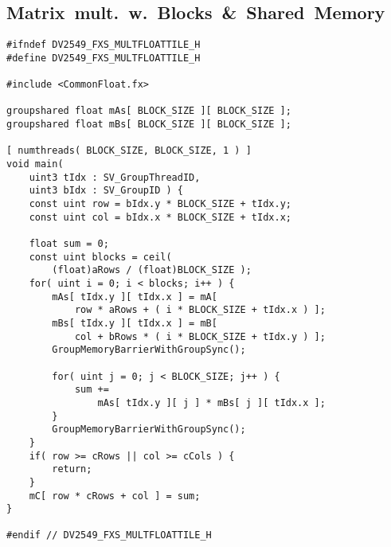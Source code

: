 \documentclass[fleqn,10pt]{SelfArx} %
\begin{document}
\subsection*{Matrix~mult.~w.~Blocks~\&~Shared~Memory}
\begin{lstlisting}
#ifndef DV2549_FXS_MULTFLOATTILE_H
#define DV2549_FXS_MULTFLOATTILE_H

#include <CommonFloat.fx>

groupshared float mAs[ BLOCK_SIZE ][ BLOCK_SIZE ];
groupshared float mBs[ BLOCK_SIZE ][ BLOCK_SIZE ];

[ numthreads( BLOCK_SIZE, BLOCK_SIZE, 1 ) ]
void main(
	uint3 tIdx : SV_GroupThreadID,
	uint3 bIdx : SV_GroupID ) {
	const uint row = bIdx.y * BLOCK_SIZE + tIdx.y;
	const uint col = bIdx.x * BLOCK_SIZE + tIdx.x;
	
	float sum = 0;
	const uint blocks = ceil( 
		(float)aRows / (float)BLOCK_SIZE );
	for( uint i = 0; i < blocks; i++ ) {
		mAs[ tIdx.y ][ tIdx.x ] = mA[ 
			row * aRows + ( i * BLOCK_SIZE + tIdx.x ) ];
		mBs[ tIdx.y ][ tIdx.x ] = mB[ 
			col + bRows * ( i * BLOCK_SIZE + tIdx.y ) ];
		GroupMemoryBarrierWithGroupSync();
        
		for( uint j = 0; j < BLOCK_SIZE; j++ ) {
			sum += 
				mAs[ tIdx.y ][ j ] * mBs[ j ][ tIdx.x ];
		}
		GroupMemoryBarrierWithGroupSync();
	}
	if( row >= cRows || col >= cCols ) {
		return;
	}
	mC[ row * cRows + col ] = sum;
}

#endif // DV2549_FXS_MULTFLOATTILE_H

\end{lstlisting}



\end{document}
